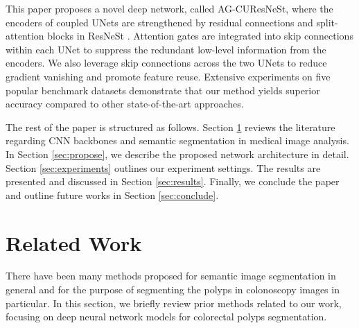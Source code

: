\documentclass[review, sort&compress]{elsarticle}
\begin{document}
	This paper proposes a novel deep network, called AG-CUResNeSt, where the encoders of coupled UNets are strengthened by residual connections and split-attention blocks in ResNeSt \cite{zhang2020resnest}. Attention gates are integrated into skip connections within each UNet to suppress the redundant low-level information from the encoders. We also leverage skip connections across the two UNets \cite{tang2019cu} to reduce gradient vanishing and promote feature reuse. Extensive experiments on five popular benchmark datasets demonstrate that our method yields superior accuracy compared to other state-of-the-art approaches.
	
	The rest of the paper is structured as follows. Section \ref{sec:related} reviews the literature regarding CNN backbones and semantic segmentation in medical image analysis. In Section \ref{sec:propose}, we describe the proposed network architecture in detail. Section \ref{sec:experiments} outlines our experiment settings. The results are presented and discussed in Section \ref{sec:results}. Finally, we conclude the paper and outline future works in Section \ref{sec:conclude}.
	
	\section{Related Work}
	\label{sec:related}
	There have been many methods proposed for semantic image segmentation in general and for the purpose of segmenting the polyps in colonoscopy images in particular. In this section, we briefly review prior methods related to our work, focusing on deep neural network models for colorectal polyps segmentation.
	
\end{document}
